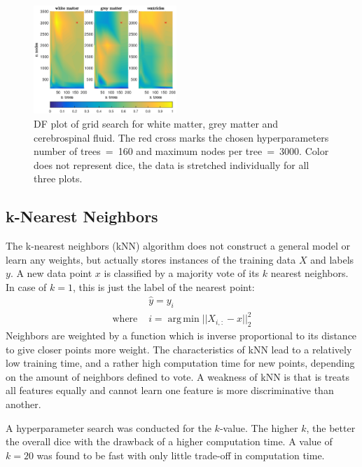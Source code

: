 \documentclass[journal]{IEEEtran}
\DeclareMathOperator*{\argmin}{arg\,min}
\begin{document}
\begin{figure}[h!]
	\centering
	\includegraphics[width=0.48\textwidth]{images/df_grid}
	\caption{DF plot of grid search for white matter, grey matter and cerebrospinal fluid. The red cross marks the chosen hyperparameters number of trees~=~160 and maximum nodes per tree~=~3000. Color does not represent dice, the data is stretched individually for all three plots.}\label{f.df_gridsearch}
\end{figure}

\subsection{k-Nearest Neighbors}
The k-nearest neighbors (kNN) algorithm does not construct a general model or learn any weights, but actually stores instances of the training data $X$ and labels $y$. A new data point $x$ is classified by a majority vote of its $k$ nearest neighbors. In case of $k=1$, this is just the label of the nearest point:
\begin{equation}
\begin{split}
& \hat{y} = y_i \\
\text{where } & i = \argmin ||X_{i,:} - x||_2^2
\end{split}
\end{equation}
Neighbors are weighted by a function which is inverse proportional to its distance to give closer points more weight. The characteristics of kNN lead to a relatively low training time, and a rather high computation time for new points, depending on the amount of neighbors defined to vote. A weakness of kNN is that is treats all features equally and cannot learn one feature is more discriminative than another.

A hyperparameter search was conducted for the $k$-value. The higher $k$, the better the overall dice with the drawback of a higher computation time. A value of $k=20$ was found to be fast with only little trade-off in computation time.
\end{document}
